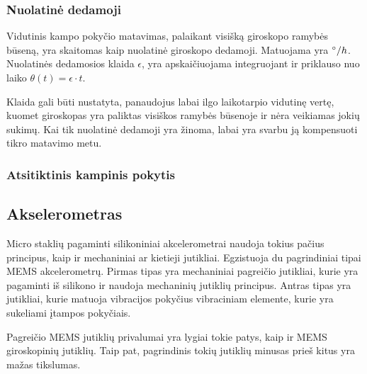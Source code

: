 \subsubsection{Nuolatinė dedamoji}

Vidutinis kampo pokyčio matavimas, palaikant visišką giroskopo ramybės būseną, yra skaitomas kaip nuolatinė giroskopo dedamoji. Matuojama yra $\degree/h$. Nuolatinės dedamosios klaida $\epsilon$, yra apskaičiuojama integruojant ir priklauso nuo laiko $\theta(t) = \epsilon \cdot t$.

Klaida gali būti nustatyta, panaudojus labai ilgo laikotarpio vidutinę vertę, kuomet giroskopas yra paliktas visiškos ramybės būsenoje ir nėra veikiamas jokių sukimų. Kai tik nuolatinė dedamoji yra žinoma, labai yra svarbu ją kompensuoti tikro matavimo metu.

\subsubsection{Atsitiktinis kampinis pokytis}


\subsection{Akselerometras}

Micro staklių pagaminti silikoniniai akcelerometrai naudoja tokius pačius principus, kaip ir mechaniniai ar kietieji jutikliai. Egzistuoja du pagrindiniai tipai MEMS akcelerometrų. Pirmas tipas yra mechaniniai pagreičio jutikliai, kurie yra pagaminti iš silikono ir naudoja mechaninių jutiklių principus. Antras tipas yra jutikliai, kurie matuoja vibracijos pokyčius vibraciniam elemente, kurie yra sukeliami įtampos pokyčiais.

Pagreičio MEMS jutiklių privalumai yra lygiai tokie patys, kaip ir MEMS giroskopinių jutiklių. Taip pat, pagrindinis tokių jutiklių minusas prieš kitus yra mažas tikslumas. 


